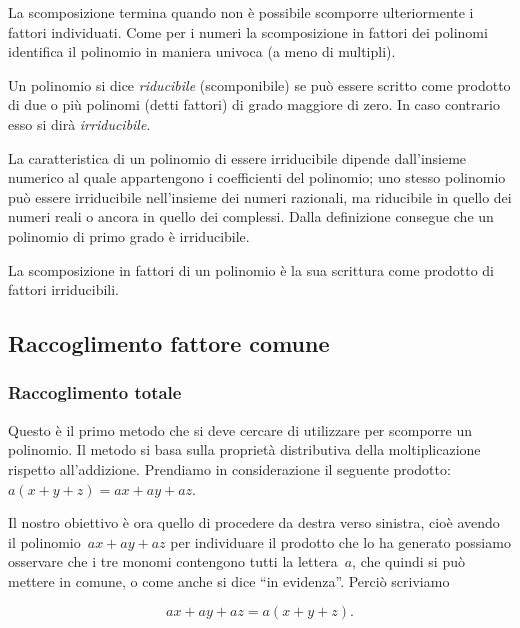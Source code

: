 La scomposizione termina quando non è possibile scomporre ulteriormente i 
fattori individuati.
Come per i numeri la scomposizione in fattori dei polinomi identifica il 
polinomio in maniera univoca (a meno di multipli).

\begin{definizione}
Un polinomio si dice \emph{riducibile} (scomponibile) se può essere scritto 
come prodotto di due o più polinomi (detti fattori) di grado maggiore di zero.
In caso contrario esso si dirà \emph{irriducibile}.
\end{definizione}

La caratteristica di un polinomio di essere irriducibile dipende dall'insieme 
numerico al quale appartengono i coefficienti del polinomio;
uno stesso polinomio può essere irriducibile nell'insieme dei numeri 
razionali, ma riducibile in quello dei numeri reali o ancora in quello dei 
complessi.
Dalla definizione consegue che un polinomio di primo grado è irriducibile.

\begin{definizione}
La scomposizione in fattori di un polinomio è la sua scrittura come prodotto 
di fattori irriducibili.
\end{definizione}

\subsection{Raccoglimento fattore comune}
\label{subsec:divpol_fattorecomune}

\subsubsection{Raccoglimento totale}

Questo è il primo metodo che si deve cercare di utilizzare per scomporre un 
polinomio.
Il metodo si basa sulla proprietà distributiva della moltiplicazione rispetto 
all'addizione.
Prendiamo in considerazione il seguente prodotto:~$a(x+y+z)=ax+ay+az$.

Il nostro obiettivo è ora quello di procedere da destra verso sinistra, 
cioè avendo il polinomio~$ax+ay+az$ per individuare il 
prodotto che lo ha generato possiamo osservare che i tre monomi contengono 
tutti la lettera~$a$, che quindi si può mettere in comune,
o come anche si dice ``in evidenza''. Perciò scriviamo 

\[ax+ay+az=a(x+y+z).\]

